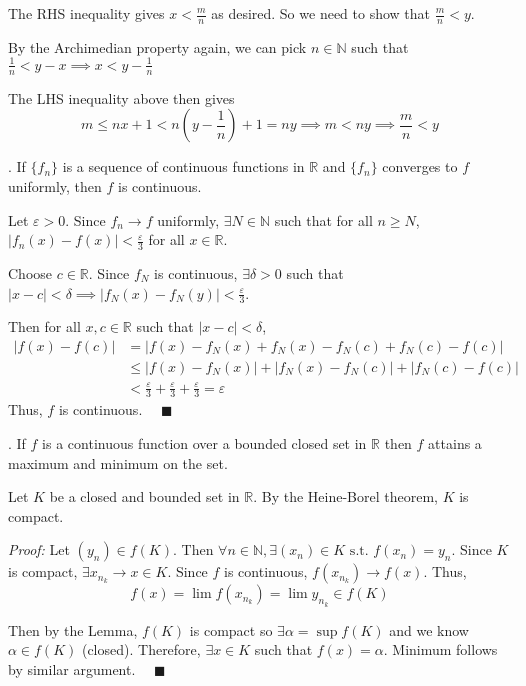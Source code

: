 \documentclass[12pt]{article}
\newcommand{\R}{\mathbb{R}}
\newcommand{\N}{\mathbb{N}}
\newcommand{\qed}{\quad \blacksquare}
\newcommand{\abs}[1]{\left\vert #1 \right\vert}
\newcommand{\ep}{\varepsilon}
\newcommand{\sub}{\subseteq}
\newcommand{\st}{\text{ s.t. }}
\newenvironment*{tbox}[2][gray]{
    \begin{tcolorbox}[
        parbox=false,
        colback=#1!5!white,
        colframe=#1!75!black,
        breakable,
        title={#2}
    ]}
    {\end{tcolorbox}}
\begin{document}
    The RHS inequality gives $x < \frac{m}{n}$ as desired. So we need to show that $\frac{m}{n} < y$. 

    By the Archimedian property again, we can pick $n \in \N$ such that $\frac{1}{n} < y - x \implies x < y - \frac{1}{n}$

    The LHS inequality above then gives 
    \[m \leq nx + 1 < n(y - \frac{1}{n}) + 1 = ny \implies m < ny \implies \frac{m}{n} < y\] 
    
\color{black}


. If $\{f_n\}$ is a sequence of continuous functions in $\R$ and $\{f_n\}$ converges to
$f$ uniformly, then $f$ is continuous.

\color{blue}
    Let $\ep > 0$. Since $f_n \to f$ uniformly, $\exists N \in \N$ such that for all $n \geq N$, $\abs{f_n(x) - f(x)} < \frac{\ep}{3}$ for all $x \in \R$. 

    Choose $c \in \R$. Since $f_N$ is continuous, $\exists \delta > 0$ such that $\abs{x - c} < \delta \implies \abs{f_N(x) - f_N(y)} < \frac{\ep}{3}$. 

    Then for all $x, c\in \R$ such that $\abs{x - c} < \delta$, 
    \begin{align*}
        \abs{f(x) - f(c)} &= \abs{f(x) - f_N(x) + f_N(x) - f_N(c) + f_N(c) - f(c)} \\
        &\leq \abs{f(x) - f_N(x)} + \abs{f_N(x) - f_N(c)} + \abs{f_N(c) - f(c)} \\
        &< \frac{\ep}{3} + \frac{\ep}{3} + \frac{\ep}{3} = \ep
    \end{align*}
    Thus, $f$ is continuous. $\qed$ 
\color{black}


. If $f$ is a continuous function over a bounded closed set in $\R$ then $f$ attains a
maximum and minimum on the set.

\color{blue}
    Let $K$ be a closed and bounded set in $\R$. By the Heine-Borel theorem, $K$ is compact. 

    \begin{tbox}[blue]{\emph{Lemma:} If $f: A \to \R$ is continuous on $A$, $f(K)$ is compact for compact $K \sub A$ }
        \emph{Proof:} Let $(y_n) \in f(K)$. Then $\forall n \in \N, \exists (x_n) \in K \st f(x_n) = y_n$. Since $K$ is compact, $\exists x_{n_k} \to x \in K$. Since $f$ is continuous, $f(x_{n_k}) \to f(x)$. Thus, 
        \[f(x) = \lim f(x_{n_k}) = \lim y_{n_k} \in f(K)\] 
    \end{tbox}

    Then by the Lemma, $f(K)$ is compact so $\exists \alpha = \sup f(K)$ and we know $\alpha \in f(K)$ (closed). Therefore, $\exists x \in K$ such that $f(x) = \alpha$. Minimum follows by similar argument. $\qed$

\color{black}
\end{document}
